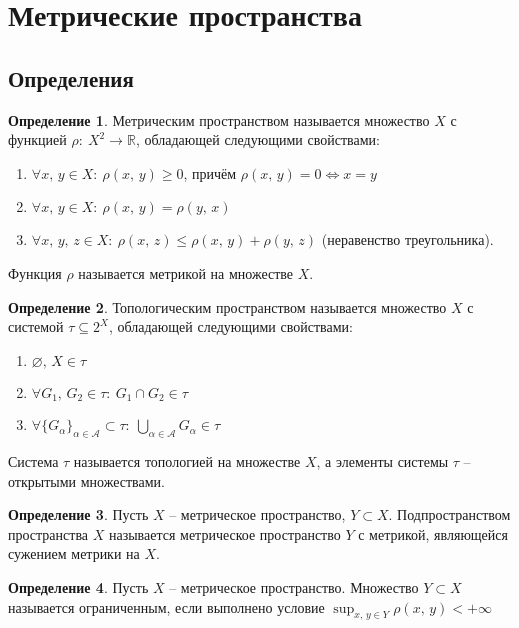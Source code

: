 \documentclass[a4paper,12pt]{article}
\renewcommand{\leq}{\ensuremath{\leqslant}}
\renewcommand{\geq}{\ensuremath{\geqslant}}
\renewcommand{\emptyset}{\ensuremath{\varnothing}}
\theoremstyle{plain}
\theoremstyle{definition}
\newtheorem{definition}{Определение}[section]
\theoremstyle{remark}
\begin{document}
\tableofcontents
\newpage

\section{Метрические пространства}

\subsection{Определения}
\begin{definition}
	Метрическим пространством называется множество $X$ с функцией $\rho :\: X^2 \to \mathbb{R}$, обладающей следующими свойствами:
	\begin{enumerate}
		\item $\forall x,\, y \in X :\: \rho(x,\,y) \geq 0$, причём $\rho(x,\,y) = 0 \Leftrightarrow x = y$
		\item $\forall x,\, y \in X :\: \rho(x,\,y) = \rho(y,\,x)$
		\item $\forall x,\,y,\,z \in X :\: \rho(x,\, z) \leq \rho(x,\,y) + \rho(y,\,z)$ (неравенство треугольника).
	\end{enumerate}
	Функция $\rho$ называется метрикой на множестве $X$.
\end{definition}

\begin{definition}
	Топологическим пространством называется множество $X$ с системой $\tau \subseteq 2^X$, обладающей следующими свойствами:
	\begin{enumerate}
		\item $\emptyset,\, X \in \tau$
		\item $\forall G_1,\, G_2 \in \tau :\: G_1 \cap G_2 \in \tau$
		\item $\forall \{G_\alpha\}_{\alpha \in \mathcal{A}} \subset \tau :\: \bigcup_{\alpha \in \mathcal{A}} G_\alpha \in \tau$
	\end{enumerate}
	Система $\tau$ называется топологией на множестве $X$, а элементы системы $\tau$ -- открытыми множествами.
\end{definition}

\begin{definition}
	Пусть $X$ -- метрическое пространство, $Y \subset X$. Подпространством пространства $X$ называется метрическое пространство $Y$ с метрикой, являющейся сужением метрики на $X$.
\end{definition}

\begin{definition}
	Пусть $X$ -- метрическое пространство. Множество $Y \subset X$ называется ограниченным, если выполнено условие $\sup_{x,\, y \in Y}\rho(x,\,y) < +\infty$
\end{definition}
\end{document}
